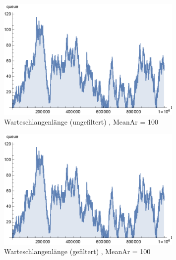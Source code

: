 \begin{figure}[htpb]
	\centering
	\includegraphics[width=0.8\textwidth]{abbildungen/1_Phone/Arrival_100_Serve_100_dur_1000000_Skip_0/QueueStepPlotAll.pdf}
	\caption{Warteschlangenlänge (ungefiltert) , MeanAr = 100}
	\label{fig:QueueStepPlotAll100}
\end{figure}
\begin{figure}[htpb]
	\centering
	\includegraphics[width=0.8\textwidth]{abbildungen/1_Phone/Arrival_100_Serve_100_dur_1000000_Skip_0/QueueStepPlotAllFiltered.pdf}
	\caption{Warteschlangenlänge (gefiltert) , MeanAr = 100}
	\label{fig:QueueStepPlotAllFiltered100}
\end{figure}

